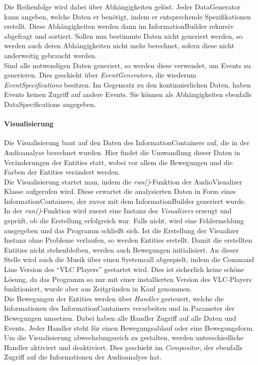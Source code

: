 \documentclass[11pt,a4paper]{article}
\begin{document}
Die Reihenfolge wird dabei über Abhängigkeiten gelöst. Jeder DataGenerator kann angeben, welche Daten er benötigt, indem er entsprechende Spezifikationen erstellt. Diese Abhängigkeiten werden dann im InformationBuilder rekursiv abgefragt und sortiert. Sollen nun bestimmte Daten nicht generiert werden, so werden auch deren Abhängigkeiten nicht mehr berechnet, sofern diese nicht anderweitig gebraucht werden.\\
Sind alle notwendigen Daten generiert, so werden diese verwendet, um Events zu generieren. Dies geschieht über \textit{EventGenerators}, die wiederum \textit{EventSpecifications} besitzen. Im Gegensatz zu den kontinuierlichen Daten, haben Events keinen Zugriff auf andere Events. Sie können als Abhängigkeiten ebenfalls DataSpecifications angegeben.

\paragraph{Visualisierung}
Die Visualisierung baut auf den Daten des InformationContainers auf, die in der Audioanalyse berechnet wurden. Hier findet die Umwandlung dieser Daten in Veränderungen der Entities statt, wobei vor allem die Bewegungen und die Farben der Entities verändert werden.\\
Die Visualisierung startet man, indem die \textit{run()}-Funktion der AudioVisualizer Klasse aufgerufen wird. Diese erwartet die analysierten Daten in Form eines InformationContainers, der zuvor mit dem InformationBuilder generiert wurde. In der \textit{run()}-Funktion wird zuerst eine Instanz des \textit{Visualizers} erzeugt und geprüft, ob die Erstellung erfolgreich war. Falls nicht, wird eine Fehlermeldung ausgegeben und das Programm schließt sich. Ist die Erstellung der Visualizer Instanz ohne Probleme verlaufen, so werden Entities erstellt. Damit die erstellten Entities nicht stehenbleiben, werden auch Bewegungen initialisiert. An dieser Stelle wird auch die Musik über einen Systemcall abgespielt, indem die Command Line Version des ``VLC Players'' gestartet wird. Dies ist sicherlich keine schöne Lösung, da das Programm so nur mit einer installierten Version des VLC-Players funktioniert, wurde aber aus Zeitgründen in Kauf genommen.\\
Die Bewegungen der Entities werden über \textit{Handler} gesteuert, welche die Informationen des InformationContainers verarbeiten und in Parameter der Bewegungen umsetzen. Dabei haben alle Handler Zugriff auf alle Daten und Events. Jeder Handler steht für einen Bewegungsablauf oder eine Bewegungsform. Um die Visualisierung abwechslungsreich zu gestalten, werden unterschiedliche Handler aktiviert und deaktiviert. Dies geschieht im \textit{Compositor}, der ebenfalls Zugriff auf die Informationen der Audioanalyse hat.
\end{document}
